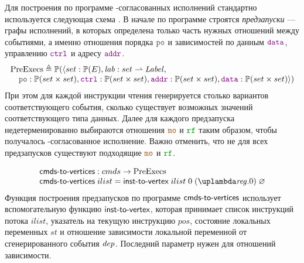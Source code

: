 Для построения по программе \ARM-согласованных исполнений стандартно
используется следующая схема \cite{Vafeiadis-Narayan:OOPSLA13}.
В начале по программе строятся \emph{предзапуски} --- графы исполнений, в которых определена
только часть нужных отношений между событиями, а именно отношения порядка $\lPO$ и зависимостей
по данным $\lDATA$, управлению $\lCTRL$ и адресу $\lADDR$.
\[
\inarr{
  \PreExecutions \defeq \Pset(\langle set : \Pset(E), \lab : set \rightharpoonup \Label, \\
   \quad \lPO : \Pset(set \times set), \lCTRL : \Pset(set \times set),
         \lADDR : \Pset(set \times set), \lDATA : \Pset(set \times set) \rangle) \\
}\]
При этом для каждой инструкции чтения
генерируется столько вариантов соответствующего события, сколько существует возможных значений
соответствующего типа данных.
Далее для каждого предзапуска недетерменированно выбираются отношения $\lCO$ и $\lRF$
таким образом, чтобы получалось \ARM-согласованное исполнение. Важно отменить, что не для всех предзапусков
существуют подходящие $\lCO$ и $\lRF$.

\[
\inarr{
  \cmdsToVrtxs : \Carm \rightarrow \PreExecutions \\
  \cmdsToVrtxs \; ilist = \instToVrtx \; ilist \; 0 \; (\lambda \reg. 0) \; \emptyset \\
}\]
Функция построения предзапусков по программе $\textup{\sf cmds-to-vertices}$ использует вспомогательную функцию $\textup{\sf inst-to-vertex}$,
которая принимает список инструкций потока $ilist$, указатель на текущую инструкцию $pos$,
состояние локальных переменных $st$ и отношение зависимости локальной переменной от сгенерированного события $\mathit{dep}$.
Последний параметр нужен для отношений зависимости.

